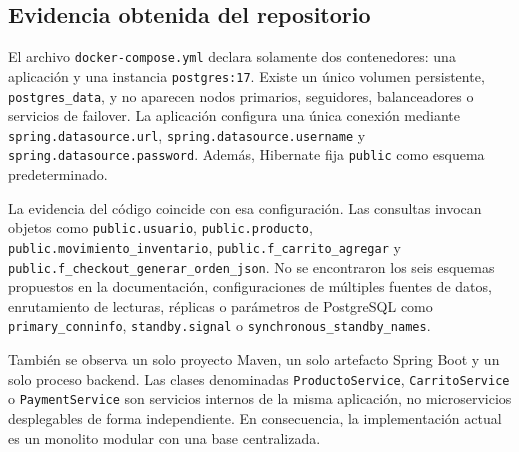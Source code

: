 \documentclass[11pt,a4paper]{article}
\begin{document}
\subsection{Evidencia obtenida del repositorio}

El archivo \texttt{docker-compose.yml} declara solamente dos contenedores: una aplicación y una instancia \texttt{postgres:17}. Existe un único volumen persistente, \texttt{postgres\_data}, y no aparecen nodos primarios, seguidores, balanceadores o servicios de failover. La aplicación configura una única conexión mediante \texttt{spring.datasource.url}, \texttt{spring.datasource.username} y \texttt{spring.datasource.password}. Además, Hibernate fija \texttt{public} como esquema predeterminado.

La evidencia del código coincide con esa configuración. Las consultas invocan objetos como \texttt{public.usuario}, \texttt{public.producto}, \texttt{public.movimiento\_inventario}, \texttt{public.f\_carrito\_agregar} y \texttt{public.f\_checkout\_generar\_orden\_json}. No se encontraron los seis esquemas propuestos en la documentación, configuraciones de múltiples fuentes de datos, enrutamiento de lecturas, réplicas o parámetros de PostgreSQL como \texttt{primary\_conninfo}, \texttt{standby.signal} o \texttt{synchronous\_standby\_names}.

También se observa un solo proyecto Maven, un solo artefacto Spring Boot y un solo proceso backend. Las clases denominadas \texttt{ProductoService}, \texttt{CarritoService} o \texttt{PaymentService} son servicios internos de la misma aplicación, no microservicios desplegables de forma independiente. En consecuencia, la implementación actual es un monolito modular con una base centralizada.
\end{document}
